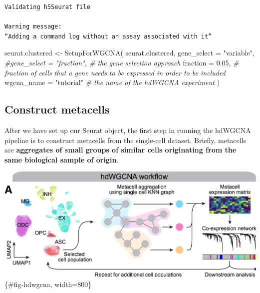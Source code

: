 \documentclass[
  letterpaper,
  DIV=11,
  numbers=noendperiod]{scrartcl}
\newenvironment{Shaded}{\begin{snugshade}}{\end{snugshade}}
\newcommand{\AttributeTok}[1]{\textcolor[rgb]{0.49,0.56,0.16}{#1}}
\newcommand{\CommentTok}[1]{\textcolor[rgb]{0.38,0.63,0.69}{\textit{#1}}}
\newcommand{\FloatTok}[1]{\textcolor[rgb]{0.25,0.63,0.44}{#1}}
\newcommand{\FunctionTok}[1]{\textcolor[rgb]{0.02,0.16,0.49}{#1}}
\newcommand{\NormalTok}[1]{\textcolor[rgb]{0.00,0.44,0.13}{#1}}
\newcommand{\OtherTok}[1]{\textcolor[rgb]{0.00,0.44,0.13}{#1}}
\newcommand{\StringTok}[1]{\textcolor[rgb]{0.25,0.44,0.63}{#1}}
\begin{document}
\begin{verbatim}
Validating h5Seurat file

Warning message:
“Adding a command log without an assay associated with it”
\end{verbatim}

\begin{Shaded}
\begin{Highlighting}[]
\NormalTok{seurat.clustered }\OtherTok{\textless{}{-}} \FunctionTok{SetupForWGCNA}\NormalTok{(}
\NormalTok{  seurat.clustered,}
  \AttributeTok{gene\_select =} \StringTok{"variable"}\NormalTok{,}
  \CommentTok{\#gene\_select = "fraction", \# the gene selection approach}
  \AttributeTok{fraction =} \FloatTok{0.05}\NormalTok{, }\CommentTok{\# fraction of cells that a gene needs to be expressed in order to be included}
  \AttributeTok{wgcna\_name =} \StringTok{"tutorial"} \CommentTok{\# the name of the hdWGCNA experiment}
\NormalTok{)}
\end{Highlighting}
\end{Shaded}

\hypertarget{construct-metacells}{%
\subsection{Construct metacells}\label{construct-metacells}}

After we have set up our Seurat object, the first step in running the
hdWGCNA pipeline is to construct metacells from the single-cell dataset.
Briefly, metacells are \textbf{aggregates of small groups of similar
cells originating from the same biological sample of origin}.

\includegraphics{./images/hdwgcna.jpg} \{\#fig-hdwgcna, width=800\}
\end{document}
